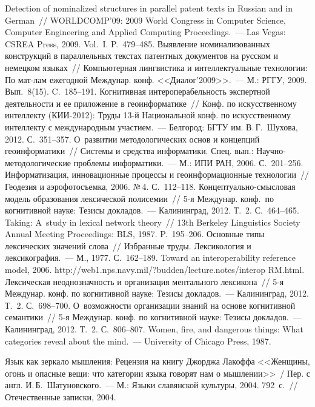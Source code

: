 \begin{multicols}{2}
{{\begin{thebibliography}{99}
 Detection of nominalized structures in parallel patent texts in Russian and in 
German~// WORLDCOMP'09:  2009 World Congress in Computer Science, Computer 
Engineering and Applied Computing Proceedings.~--- Las Vegas: CSREA Press, 2009. Vol.~I. 
P.~479--485.
 Выявление номинализованных конструкций в параллельных 
текстах патентных документов на русском и немецком языках~// Компьютерная 
лингвистика и интеллектуальные технологии: По мат-лам ежегодной Междунар. 
конф. <<Диалог'2009>>.~--- М.: РГГУ, 2009. Вып.~8(15). C.~185--191.
 Когнитивная интероперабельность 
экспертной деятельности и ее приложение в геоинформатике~// Конф. по искусственному 
интеллекту (КИИ-2012): Труды 13-й Национальной конф. по искусственному интеллекту с 
международным участием.~--- Белгород: БГТУ им. В.\,Г.~Шухова, 2012. С.~351--357.
 О~развитии методологических основ и концепций 
геоинформатики~// Сис\-те\-мы и средства информатики. Спец. вып.: 
На\-уч\-но-ме\-то\-до\-ло\-ги\-че\-ские проблемы информатики.~--- М.: ИПИ РАН, 2006. С.~201--256.
 Информатизация, инновационные процессы и геоинформационные 
технологии~// Геодезия и аэрофотосъемка, 2006. №\,4. С.~112--118.
 Кон\-цеп\-ту\-аль\-но-смыс\-ло\-вая модель образования лексической 
полисемии~// 5-я Междунар. конф.\ по когнитивной науке: Тезисы докладов.~--- 
Калининград, 2012. Т.~2. С.~464--465.
 Taking: A~study in lexical network theory~//  13th Berkeley 
Linguistics Society Annual Meeting Proceedings: BLS, 1987. P.~195--206.
 Основные типы лексических значений слова~// 
Избранные труды. Лексикология и лексикография.~--- М., 1977. С.~162--189.
 Toward an interoperability reference model, 2006. {\sf 
http://web1.nps.navy.mil/?budden/\linebreak lecture.notes/interop RM.html}.
 Лексическая 
неоднозначность и организация ментального лексикона~// 5-я Междунар. конф. по 
когнитивной науке: Тезисы докладов.~--- Калининград, 2012. Т.~2. С.~698--700.
 О~возможности организации знаний на основе когнитивной 
семантики~// 5-я Междунар. конф. по когнитивной науке: Тезисы докладов.~--- 
Калининград, 2012. Т.~2. С.~806--807.
 Women, fire, and dangerous things: What categories reveal about the mind.~--- 
University of Chicago Press, 1987.

\label{end\stat}

 Язык как зеркало мышления: Рецензия на книгу Джорджа Лакоффа 
<<Женщины, огонь и опасные вещи: что категории языка говорят нам о мышлении>>~/ 
Пер. с англ. И.\,Б.~Шатуновского.~--- М.: Языки славянской культуры, 2004. 792~с.~// 
Отечественные записки, 2004.
\end{thebibliography} } }

\end{multicols}
